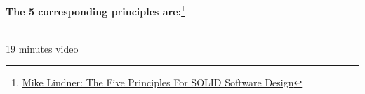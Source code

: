 \documentclass[calcdimensions,landscape,letterpaper]{powersem}
\newcommand{\thecurrentheading}{}
\newcommand{\heading}[1]{\renewcommand{\thecurrentheading}{#1}}
\begin{document}
\begin{slide}
  \heading{The 5 Principles}
  \begin{center}
    \textbf{The 5 corresponding principles are:}\footnote{\href{https://swarch.blog/the-five-principles-for-solid-software-design/}{Mike Lindner: The Five Principles For SOLID Software Design}}\\
  \end{center}
\end{slide}

\begin{slide}
  \heading{Arjan Egges: Uncle Bob's SOLID Principles Made Easy}
  \begin{center}
    \href{https://www.youtube.com/watch?v=pTB30aXS77U}{}\\
    {\small 19 minutes video}
  \end{center}
\end{slide}
\end{document}
